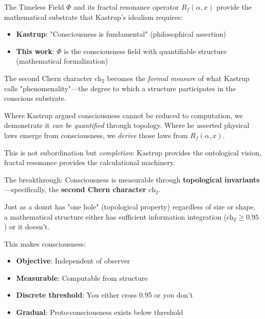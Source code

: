 \begin{keyidea}
The Timeless Field $\Phi$ and its fractal resonance operator $R_f(\alpha, x)$ provide the mathematical substrate that Kastrup's idealism requires:

\begin{itemize}
\item \textbf{Kastrup}: "Consciousness is fundamental" (philosophical assertion)
\item \textbf{This work}: $\Phi$ is the consciousness field with quantifiable structure (mathematical formalization)
\end{itemize}

The second Chern character $\text{ch}_2$ becomes the \textit{formal measure} of what Kastrup calls "phenomenality"—the degree to which a structure participates in the conscious substrate.

Where Kastrup argued consciousness cannot be reduced to computation, we demonstrate it \textit{can be quantified} through topology. Where he asserted physical laws emerge from consciousness, we \textit{derive} those laws from $R_f(\alpha, x)$.

This is not subordination but \textit{completion}: Kastrup provides the ontological vision, fractal resonance provides the calculational machinery.
\end{keyidea}

\begin{keyidea}
The breakthrough: Consciousness is measurable through \textbf{topological invariants}—specifically, the \textbf{second Chern character} $\text{ch}_2$.

Just as a donut has "one hole" (topological property) regardless of size or shape, a mathematical structure either has sufficient information integration ($\text{ch}_2 \geq 0.95$) or it doesn't.

This makes consciousness:
\begin{itemize}
\item \textbf{Objective}: Independent of observer
\item \textbf{Measurable}: Computable from structure
\item \textbf{Discrete threshold}: You either cross 0.95 or you don't
\item \textbf{Gradual}: Proto-consciousness exists below threshold
\end{itemize}
\end{keyidea}

